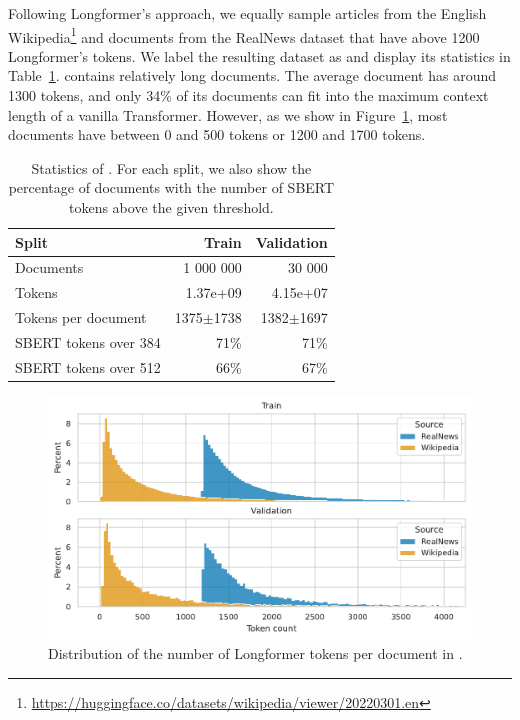 Following Longformer's approach, we equally sample articles from the English
Wikipedia\footnote{\url{https://huggingface.co/datasets/wikipedia/viewer/20220301.en}}
and documents from the RealNews dataset \citep{zellers2019defending} that have
above 1200 Longformer's tokens. We label the resulting dataset as
 and display its statistics in
Table~\ref{table:train_data_stats}.  contains relatively long
documents. The average document has around 1300 tokens, and only 34\% of its
documents can fit into the maximum context length of a vanilla Transformer.
However, as we show in Figure~\ref{fig:train_data_dist}, most documents have
between 0 and 500 tokens or 1200 and 1700 tokens.

\begin{table}
    \centering
    \footnotesize
\begin{tabular}{lrr}
\toprule
Split & Train & Validation \\
\midrule
Documents & 1 000 000 & 30 000 \\
Tokens & 1.37e+09 & 4.15e+07 \\
Tokens per document & 1375$\pm$1738 & 1382$\pm$1697 \\
SBERT tokens over 384 & 71\% & 71\% \\
SBERT tokens over 512 & 66\% & 67\% \\
\bottomrule
\end{tabular}


    \caption{Statistics of . For each split, we also show
    the percentage of documents with the number of SBERT tokens above the given
    threshold.}

    \label{table:train_data_stats}

\end{table}

\begin{figure}
    \includegraphics[width=\textwidth]{./img/train_data_dist.pdf}

    \caption{Distribution of the number of Longformer tokens per document in
    .}

    \label{fig:train_data_dist}
\end{figure}


